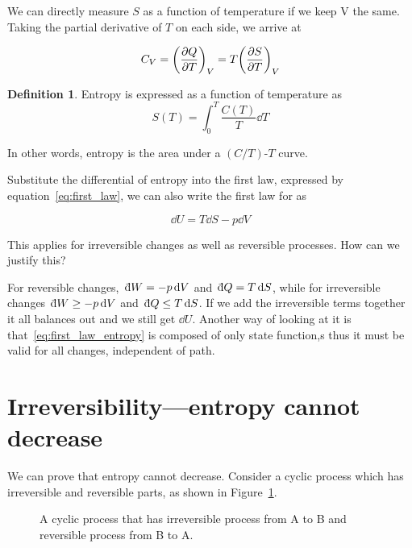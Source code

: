 \documentclass[12pt,chapterprefix=false,dvipsnames]{scrbook}
\theoremstyle{dotless}
\theoremstyle{definition}
\newtheorem{protodefinition}{Definition}[section]
\newenvironment{definition}
{\colorlet{shadecolor}{black!15}\begin{shaded}\begin{protodefinition}}
			{\end{protodefinition}\end{shaded}}
\def\dbar{{\mathchar'26\mkern-10mu \mathrm{d}}}
\begin{document}
We can directly measure $S$ as a function of
temperature if we keep V the same. Taking the partial derivative
of $T$ on each side, we arrive at

\begin{equation}
	C_V = {\left(\pdv{Q}{T}\right)}_V =
	T{\left(\pdv{S}{T}\right)}_V
\end{equation}

\begin{definition}
	Entropy is expressed as a function of temperature as
	\begin{equation}
		\label{eq:entropy_from_temperature}
		S(T) = \int_0^T\frac{C(T)}{T}\dd{T}
	\end{equation}
\end{definition}

In other words, entropy is the area under a
$(C/T)$-$T$ curve.

Substitute the differential of entropy into the first law,
expressed by equation~\ref{eq:first_law}, we can also
write the first law for as

\begin{equation}
	\label{eq:first_law_entropy}
	\dd{U} = T\dd{S} -
	p\dd{V}
\end{equation}

This applies for irreversible changes as well as reversible
processes. How can we justify this?

For reversible changes,\, $\dbar W = -p\dd{V}$ and\,
$\dbar Q = T \dd{S}$, while for irreversible changes\,
$\dbar W \geq -p\dd{V}$ and\, $\dbar Q \leq T\dd{S}$. If we add
the irreversible terms together it all balances out and we still
get $\dd{U}$. Another way of looking at it is
that~\ref{eq:first_law_entropy} is composed of only state
function,s thus it must be valid for all changes, independent of
path.

\section{Irreversibility---entropy cannot decrease}%
\label{sec:irreversibility}

We can prove that entropy cannot decrease. Consider a cyclic
process which has irreversible and reversible parts, as shown in
Figure~\ref{fig:entropy_cannot_decrease}.

\begin{figure}[htpb]
	\centering
	
	\caption{A cyclic process that has irreversible process from A to B and
		reversible process from B to A.}%
	\label{fig:entropy_cannot_decrease}
\end{figure}
\end{document}
